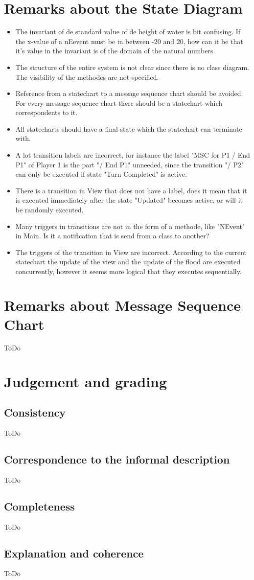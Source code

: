 \documentclass[a4paper,11pt]{article}
\begin{document}
	\section{Remarks about the State Diagram}
    \begin{itemize}
        \item The invariant of de standard value of de height of water is bit confusing. If the x-value of a nEevent must be in between -20 and 20, how can it be that it's value in the invariant is of the domain of the natural numbers.
        \item The structure of the entire system is not clear since there is no class diagram. The visibility of the methodes are not specified.
        \item Reference from a statechart to a message sequence chart should be avoided. For every message sequence chart there should be a statechart which correspondents to it.
        \item All statecharts should have a final state which the statechart can terminate with.
        \item A lot transition labels are incorrect, for instance the label "MSC for P1 / End P1" of Player 1 is the part "/ End P1" unneeded, since the transition "/ P2" can only be executed if state "Turn Completed" is active.
        \item There is a transition in View that does not have a label, does it mean that it is executed immediately after the state "Updated" becomes active, or will it be randomly executed.
        \item Many triggers in transitions are not in the form of a methode, like "NEvent" in Main. Is it a notification that is send from a class to another?
        \item The triggers of the transition in View are incorrect. According to the current statechart the update of the view and the update of the flood are executed concurrently, however it seems more logical that they executes sequentially.
    \end{itemize}
    \section{Remarks about Message Sequence Chart}
    ToDo

    \section{Judgement and grading}
    \subsection{Consistency}
    ToDo

    \subsection{Correspondence to the informal description}
    ToDo

    \subsection{Completeness}
    ToDo

    \subsection{Explanation and coherence}
    ToDo
\end{document}
